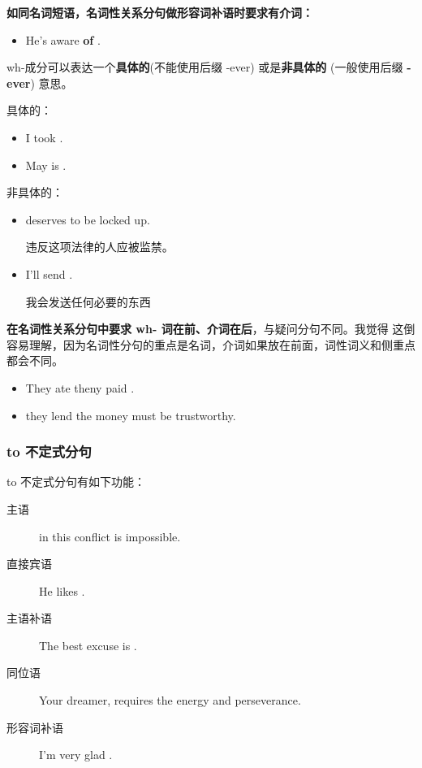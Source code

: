 \textbf{如同名词短语，名词性关系分句做形容词补语时要求有介词：}
\begin{itemize}
\item He's aware \textbf{of} .
\end{itemize}

wh-成分可以表达一个\textbf{具体的}(不能使用后缀 -ever) 或是\textbf{非具体的}
(一般使用后缀 \textbf{-ever}) 意思。

具体的：
\begin{itemize}
\item I took .
\item May is .
\end{itemize}


非具体的：
\begin{itemize}
\item {} deserves to be locked up.

  违反这项法律的人应被监禁。
\item I'll send .

  我会发送任何必要的东西
\end{itemize}

\textbf{在名词性关系分句中要求 wh- 词在前、介词在后}，与疑问分句不同。我觉得
这倒容易理解，因为名词性分句的重点是名词，介词如果放在前面，词性词义和侧重点
都会不同。
\begin{itemize}
\item They ate  theny paid .
\item {} they lend the money  must be trustworthy.
\end{itemize}

\subsubsection{to 不定式分句}

to 不定式分句有如下功能：
\begin{description}
\item[主语]  in this conflict is impossible.
\item[直接宾语] He likes .
\item[主语补语] The best excuse is .

\item[同位语] Your dreamer,  requires the
  energy and perseverance.

\item[形容词补语] I'm very glad .
\end{description}

